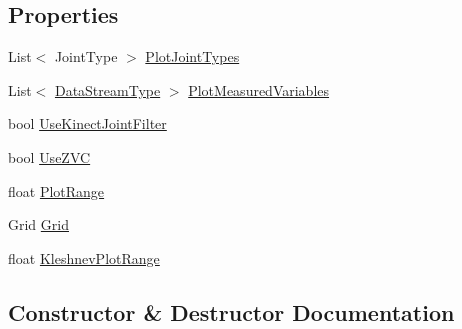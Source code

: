 \subsection*{Properties}
\begin{DoxyCompactItemize}
\item 
List$<$ Joint\+Type $>$ \hyperlink{class_rowing_monitor_1_1_view_model_1_1_debug_view_model_a41dc4f6035874ac84cf7e184d55786b5}{Plot\+Joint\+Types}
\item 
List$<$ \hyperlink{namespace_rowing_monitor_1_1_model_1_1_util_a01e1a06061533b246feb7421c9d0107f}{Data\+Stream\+Type} $>$ \hyperlink{class_rowing_monitor_1_1_view_model_1_1_debug_view_model_adeea14566ca983399b9258a6d11ccd94}{Plot\+Measured\+Variables}
\item 
bool \hyperlink{class_rowing_monitor_1_1_view_model_1_1_debug_view_model_a6b953c4498e5cf1bbe866176f2bcc194}{Use\+Kinect\+Joint\+Filter}
\item 
bool \hyperlink{class_rowing_monitor_1_1_view_model_1_1_debug_view_model_a9d8e1ac2c56509c97522a409f3c87db1}{Use\+Z\+VC}
\item 
float \hyperlink{class_rowing_monitor_1_1_view_model_1_1_debug_view_model_a3c5a6901e5cfe6d6ca2ea49f6939cc5e}{Plot\+Range}
\item 
Grid \hyperlink{class_rowing_monitor_1_1_view_model_1_1_debug_view_model_a7ab2d29ceb37f0650a15ee6c32401c3f}{Grid}
\item 
float \hyperlink{class_rowing_monitor_1_1_view_model_1_1_debug_view_model_a6945ae46c3ce1f69f39fdbdb90ae1d66}{Kleshnev\+Plot\+Range}
\end{DoxyCompactItemize}


\subsection{Constructor \& Destructor Documentation}
\mbox{\label{class_rowing_monitor_1_1_view_model_1_1_debug_view_model_a9a09d0e5bcf1e919b8bff6fd9e7bc446}} 

